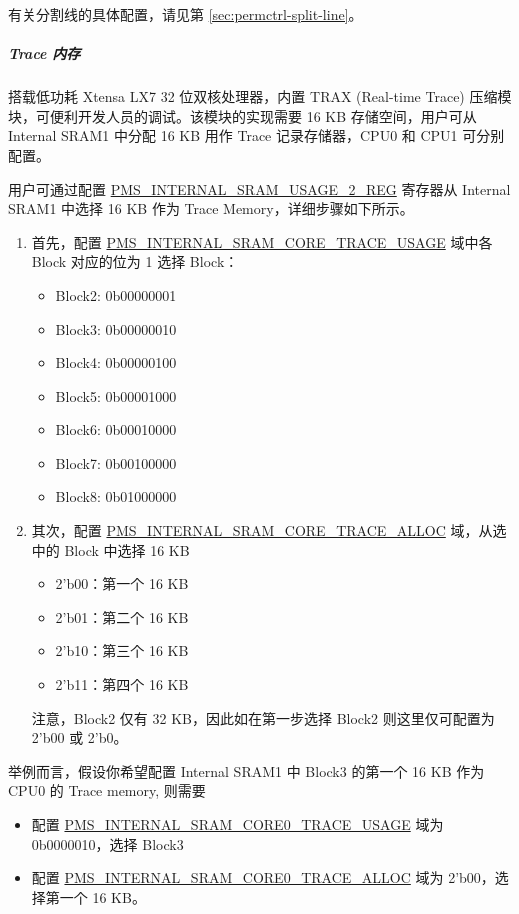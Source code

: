 \documentclass[main\_\_CN.tex]{subfiles}
\begin{document}
有关分割线的具体配置，请见第 \ref{sec:permctrl-split-line}。

\subparagraph{Trace 内存} \label{sec:permctrl_trace}
\chipname{} 搭载低功耗 Xtensa LX7 32 位双核处理器，内置 TRAX (Real-time Trace) 压缩模块，可便利开发人员的调试。该模块的实现需要 16 KB 存储空间，用户可从 Internal SRAM1 中分配 16 KB 用作 Trace 记录存储器，CPU0 和 CPU1 可分别配置。


用户可通过配置 \hyperref[regdesc:PMSINTERNALSRAMUSAGE2REG]{PMS\_INTERNAL\_SRAM\_USAGE\_2\_REG} 寄存器从 Internal SRAM1 中选择 16 KB 作为 Trace Memory，详细步骤如下所示。

\begin{enumerate}
    \item 首先，配置 \hyperref[fielddesc:PMSINTERNALSRAMCORE0TRACEUSAGE]{PMS\_INTERNAL\_SRAM\_CORE\_TRACE\_USAGE} 域中各 Block 对应的位为 1 选择 Block：
    \begin{itemize}
        \item Block2: 0b00000001
        \item Block3: 0b00000010
        \item Block4: 0b00000100
        \item Block5: 0b00001000
        \item Block6: 0b00010000
        \item Block7: 0b00100000
        \item Block8: 0b01000000
    \end{itemize}
    \item 其次，配置  \hyperref[fielddesc:PMSINTERNALSRAMCORE0TRACEALLOC]{PMS\_INTERNAL\_SRAM\_CORE\_TRACE\_ALLOC} 域，从选中的 Block 中选择 16 KB
    \begin{itemize}
        \item 2'b00：第一个 16 KB
        \item 2'b01：第二个 16 KB
        \item 2'b10：第三个 16 KB
        \item 2'b11：第四个 16 KB
    \end{itemize}
    注意，Block2 仅有 32 KB，因此如在第一步选择 Block2 则这里仅可配置为 2'b00 或 2'b0。
\end{enumerate}

举例而言，假设你希望配置 Internal SRAM1 中 Block3 的第一个 16 KB 作为 CPU0 的 Trace memory, 则需要
\begin{itemize}
    \item 配置 \hyperref[fielddesc:PMSINTERNALSRAMCORE0TRACEUSAGE]{PMS\_INTERNAL\_SRAM\_CORE0\_TRACE\_USAGE} 域为 0b0000010，选择 Block3
    \item 配置 \hyperref[fielddesc:PMSINTERNALSRAMCORE0TRACEALLOC]{PMS\_INTERNAL\_SRAM\_CORE0\_TRACE\_ALLOC} 域为 2'b00，选择第一个 16 KB。
\end{itemize}
\end{document}
